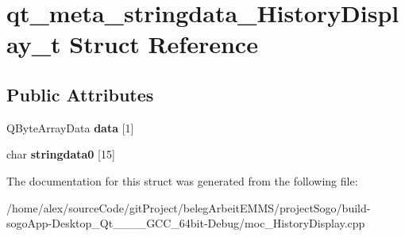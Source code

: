 \hypertarget{structqt__meta__stringdata__HistoryDisplay__t}{\section{qt\-\_\-meta\-\_\-stringdata\-\_\-\-History\-Display\-\_\-t Struct Reference}
\label{structqt__meta__stringdata__HistoryDisplay__t}
}
\subsection*{Public Attributes}
\begin{DoxyCompactItemize}
\item 
\hypertarget{structqt__meta__stringdata__HistoryDisplay__t_a91b69eb3940982c83d424696be0e9d1b}{Q\-Byte\-Array\-Data {\bfseries data} \mbox{[}1\mbox{]}}\label{structqt__meta__stringdata__HistoryDisplay__t_a91b69eb3940982c83d424696be0e9d1b}

\item 
\hypertarget{structqt__meta__stringdata__HistoryDisplay__t_affbe42e28c7e3670a03d9ac35942bb0b}{char {\bfseries stringdata0} \mbox{[}15\mbox{]}}\label{structqt__meta__stringdata__HistoryDisplay__t_affbe42e28c7e3670a03d9ac35942bb0b}

\end{DoxyCompactItemize}


The documentation for this struct was generated from the following file\-:\begin{DoxyCompactItemize}
\item 
/home/alex/source\-Code/git\-Project/beleg\-Arbeit\-E\-M\-M\-S/project\-Sogo/build-\/sogo\-App-\/\-Desktop\-\_\-\-Qt\-\_\-\_\-\_\-\_\-\-G\-C\-C\-\_\-64bit-\/\-Debug/moc\-\_\-\-History\-Display.\-cpp\end{DoxyCompactItemize}
